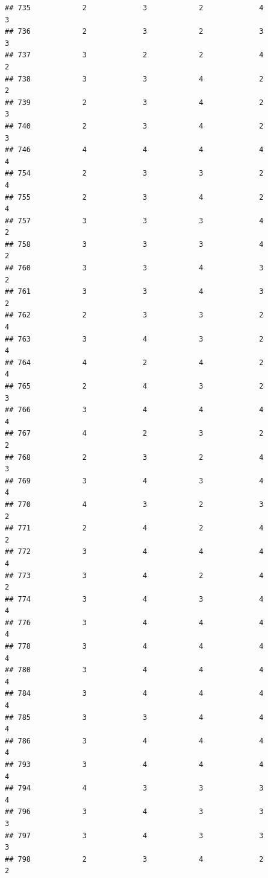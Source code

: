 \documentclass[
]{article}
\begin{document}
\begin{verbatim}
## 735            2             3            2             4          3
## 736            2             3            2             3          3
## 737            3             2            2             4          2
## 738            3             3            4             2          2
## 739            2             3            4             2          3
## 740            2             3            4             2          3
## 746            4             4            4             4          4
## 754            2             3            3             2          4
## 755            2             3            4             2          4
## 757            3             3            3             4          2
## 758            3             3            3             4          2
## 760            3             3            4             3          2
## 761            3             3            4             3          2
## 762            2             3            3             2          4
## 763            3             4            3             2          4
## 764            4             2            4             2          4
## 765            2             4            3             2          3
## 766            3             4            4             4          4
## 767            4             2            3             2          2
## 768            2             3            2             4          3
## 769            3             4            3             4          4
## 770            4             3            2             3          2
## 771            2             4            2             4          2
## 772            3             4            4             4          4
## 773            3             4            2             4          2
## 774            3             4            3             4          4
## 776            3             4            4             4          4
## 778            3             4            4             4          4
## 780            3             4            4             4          4
## 784            3             4            4             4          4
## 785            3             3            4             4          4
## 786            3             4            4             4          4
## 793            3             4            4             4          4
## 794            4             3            3             3          4
## 796            3             4            3             3          3
## 797            3             4            3             3          3
## 798            2             3            4             2          2

\end{verbatim}
\end{document}
